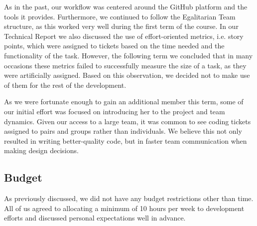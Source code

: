 \documentclass[main.tex]{subfiles}
\begin{document}
As in the past, our workflow was centered around the GitHub platform and the tools it provides.
Furthermore, we continued to follow the Egalitarian Team structure, as this worked very well during the first term of the course.
In our Technical Report \cite{TR_story} we also discussed the use of effort-oriented metrics, i.e. story points, which were assigned to tickets based on the time needed and the functionality of the task.
However, the following term we concluded that in many occasions these metrics failed to successfully measure the size of a task, as they were artificially assigned. Based on this observation, we decided not to make use of them for the rest of the development.

As we were fortunate enough to gain an additional member this term, some of our initial effort was focused on introducing her to the project and team dynamics. Given our access to a large team, it was common to see coding tickets assigned to pairs and groups rather than individuals. We believe this not only resulted in writing better-quality code, but in faster team communication when making design decisions.

\subsection{Budget}
As previously discussed, we did not have any budget restrictions other than time. All of us agreed to allocating a minimum of 10 hours per week to development efforts and discussed personal expectations well in advance. 
\end{document}
